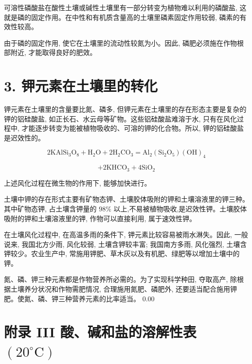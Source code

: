 \documentclass[10pt]{article}
\begin{document}
可溶性磷酸盐在酸性土壤或碱性土壤里有一部分转变为植物难以利用的磷酸盐, 这就是磷的固定作用。在中性和有机质含量高的土壤里磷素固定作用较弱, 磷素的有效性较高。

由于磷的固定作用, 使它在土壤里的流动性较氮为小。因此, 磷肥必须施在作物根部附近, 才能取得良好的肥效。

\section*{3. 钾元素在土壤里的转化}

钾元素在土壤里的含量要比氮、磷多, 但钾元素在土壤里的存在形态主要是复杂的钾的铝硅酸盐, 如正长石、水云母等矿物。这些铝硅酸盐难溶于水, 只有在风化过程中, 才能逐步转变为能被植物吸收的、可溶的钾的化合物。所以, 钾的铝硅酸盐是迟效性的。

\[
2{\mathrm{{KAlSi}}}_{3}{\mathrm{O}}_{8} + {\mathrm{H}}_{2}\mathrm{O} + 2{\mathrm{H}}_{2}{\mathrm{{CO}}}_{3} = {\mathrm{{Al}}}_{2}\left( {{\mathrm{{Si}}}_{2}{\mathrm{O}}_{5}}\right) {\left( \mathrm{{OH}}\right) }_{4}
\]

\[
+ 2{\mathrm{{KHCO}}}_{3} + 4{\mathrm{{SiO}}}_{2}
\]

上述风化过程在微生物的作用下, 能够加快进行。

土壤中钾的存在形式主要有矿物态钾、土壤胶体吸附的钾和土壤溶液里的钾三种。其中矿物态钾, 占土壤含钾量的 \({98}\%\) 以上,不易被植物吸收,是迟效性钾。土壤胶体吸附的钾和土壤溶液里的钾, 作物可以直接利用, 属于速效性钾。

在土壤风化过程中, 在高温多雨的条件下, 钾元素比较容易被雨水淋失。因此, 一般说来, 我国北方少雨, 风化较弱, 土壤含钾较丰富; 我国南方多雨, 风化强烈, 土壤含钾较少。农业生产中, 常施用钾肥、草木灰以及有机肥、绿肥等以增加土壤中的钾。

氮、磷、钾三种元素都是作物营养所必需的。为了实现科学种田, 夺取高产, 除根据土壤养分状况和作物需肥情况, 合理施用氮肥、磷肥外, 还要适当配合施用钾肥。使氮、磷、钾三种营养元素的比率适当。 0.00

\section*{附录 III 酸、碱和盐的溶解性表 \(\left( {{20}^{ \circ }\mathrm{C}}\right)\)}
\end{document}
